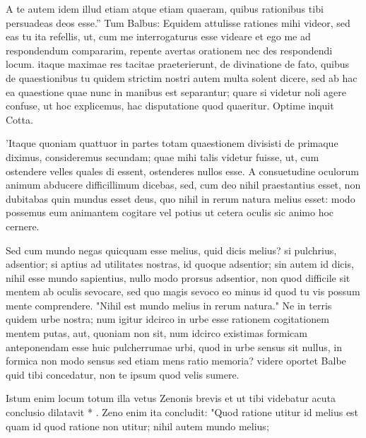  A te autem idem illud etiam atque etiam quaeram, quibus rationibus tibi persuadeas deos esse.'' Tum Balbus: Equidem attulisse rationes mihi videor, sed eas tu ita refellis, ut, cum me interrogaturus esse videare et ego me ad respondendum compararim, repente avertas orationem nec des respondendi locum. itaque maximae res tacitae praeterierunt, de divinatione de fato, quibus de quaestionibus tu quidem strictim nostri autem multa solent dicere, sed ab hac ea quaestione quae nunc in manibus est separantur; quare si videtur noli agere confuse, ut hoc explicemus, hac disputatione quod quaeritur. Optime inquit Cotta.

 'Itaque quoniam quattuor in partes totam quaestionem divisisti de primaque diximus, consideremus secundam; quae mihi talis videtur fuisse, ut, cum ostendere velles quales di essent, ostenderes nullos esse. A consuetudine oculorum animum abducere difficillimum dicebas, sed, cum deo nihil praestantius esset, non dubitabas quin mundus esset deus, quo nihil in rerum natura melius esset: modo possemus eum animantem cogitare vel potius ut cetera oculis sic animo hoc cernere.

 Sed cum mundo negas quicquam esse melius, quid dicis melius? si pulchrius, adsentior; si aptius ad utilitates nostras, id quoque adsentior; sin autem id dicis, nihil esse mundo sapientius, nullo modo prorsus adsentior, non quod difficile sit mentem ab oculis sevocare, sed quo magis sevoco eo minus id quod tu vis possum mente comprendere. "Nihil est mundo melius in rerum natura." Ne in terris quidem urbe nostra; num igitur idcirco in urbe esse rationem cogitationem mentem putas, aut, quoniam non sit, num idcirco existimas formicam anteponendam esse huic pulcherrumae urbi, quod in urbe sensus sit nullus, in formica non modo sensus sed etiam mens ratio memoria? videre oportet Balbe quid tibi concedatur, non te ipsum quod velis sumere.

 Istum enim locum totum illa vetus Zenonis brevis et ut tibi videbatur acuta conclusio dilatavit * . Zeno enim ita concludit: "Quod ratione utitur id melius est quam id quod ratione non utitur; nihil autem mundo melius;

